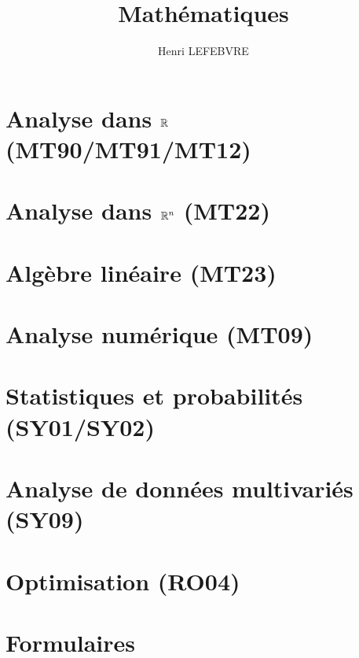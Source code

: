 \documentclass[10pt]{report}
\title{Mathématiques}
\author{Henri LEFEBVRE}
\begin{document}
    \maketitle
    \tableofcontents
    
    \chapter{Analyse dans $\mathbb{R}$ \small{(MT90/MT91/MT12)}}
    

    \chapter{Analyse dans $\mathbb{R}^n$ \small{(MT22)}}
    

    \chapter{Algèbre linéaire \small{(MT23)}}
    

    \chapter{Analyse numérique \small{(MT09)}}
    

    \chapter{Statistiques et probabilités \small{(SY01/SY02)}}
    

    \chapter{Analyse de données multivariés \small{(SY09)}}
    

    \chapter{Optimisation \small{(RO04)}}
    

    \chapter{Formulaires}
    
\end{document}

